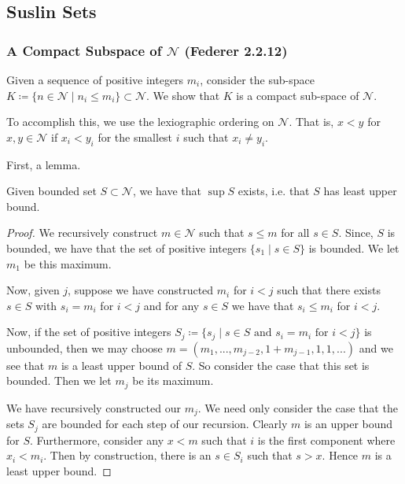 \subsection{Suslin Sets}

\subsubsection{A Compact Subspace of \(\mathcal N\) (Federer 2.2.12)}

Given a sequence of positive integers \(m_i\), consider the sub-space
\(K \coloneqq \{n \in \mathcal N \mid n_i \leq m_i\} \subset \mathcal N\). We show that \(K\) is a compact
sub-space of \(\mathcal N\).

To accomplish this, we use the lexiographic ordering on \(\mathcal N\). That is, \(x < y\) for
\(x, y \in \mathcal N\) if \(x_i < y_i\) for the smallest \(i\) such that \(x_i \neq y_i\).

First, a lemma. 
\begin{lemma}
Given bounded set \(S \subset \mathcal N\), we have that \(\sup S\) exists, i.e. that \(S\) has least
upper bound.
\end{lemma}
\begin{proof}
We recursively construct \(m \in \mathcal N\) such that \(s \leq m\) for all \(s \in S\). Since, \(S\) is
bounded, we have that the set of positive integers \(\{s_1 \mid s \in S\}\) is bounded. We let \(m_1\) be this
maximum. 

Now, given \(j\), suppose we have constructed \(m_i\) for \(i < j\) such that there exists \(s \in S\) with
\(s_i = m_i\) for \(i < j\) and for any \(s \in S\) we have that \(s_i \leq m_i\) for \(i < j\). 

Now, if the set of positive integers
\(S_j \coloneqq \{s_j \mid s \in S \text{ and } s_i = m_i \text{ for } i < j\}\) is unbounded, then we may choose 
\(m = (m_1,..., m_{j-2}, 1 + m_{j-1}, 1, 1, ...)\) and we see that \(m\) is a least upper bound of \(S\).
So consider the case that this set is bounded. Then we let \(m_j\) be its maximum.

We have recursively constructed our \(m_j\). We need only consider the case that the sets \(S_j\) are bounded
for each step of our recursion. Clearly \(m\) is an upper bound for \(S\). Furthermore, consider any \(x < m\)
such that \(i\) is the first component where \(x_i < m_i\). Then by construction, there is an \(s \in S_i\) such
that \(s > x\). Hence \(m\) is a least upper bound. 
\end{proof}

